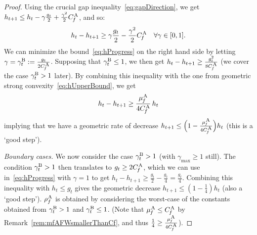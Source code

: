 \documentclass{article} %
\newcommand{\stepsize}{\gamma}
\newcommand{\stepbound}{\stepsize^\textnormal{\scriptsize B}} %
\newcommand{\away}{{\hspace{0.06em}\textnormal{\scriptsize A}}}
\newcommand{\CfAFW}{C_{\hspace{-0.08em}f}^\away}
\newcommand{\strongConvAFW}{\mu_{\hspace{-0.08em}f}^\away}
\newcommand{\0}{\mathbf{0}} %
\begin{document}
\begin{proof}
Using the crucial gap inequality~\eqref{eq:gapDirection}, we get $h_{t+1} \le
h_t - \stepsize \frac{g_t}{2} + \frac{\stepsize^2}{2} \CfAFW$, and so:
\begin{equation} \label{eq:hProgress}
h_t - h_{t+1} \ge \stepsize \frac{g_t}{2} - \frac{\stepsize^2}{2} \CfAFW
\quad \forall \stepsize \in [0,1].  
\end{equation}
We can minimize the bound~\eqref{eq:hProgress} on the right hand side by
letting $\stepsize = \stepbound_t := \frac{g_t}{2\CfAFW}$. Supposing that
$\stepbound_t \leq 1$, we then get $h_t - h_{t+1} \geq 
\frac{g_t^2}{8\CfAFW}$ (we cover the case $\stepbound_t > 1$ later).  By
combining this inequality with the one from geometric strong
convexity~\eqref{eq:hUpperBound}, we get 
\begin{equation} \label{eq:mainGeometric}
h_t - h_{t+1} \ge \frac{\strongConvAFW}{4\CfAFW} \, h_t
\end{equation}
implying that we have a geometric rate of decrease $h_{t+1} \leq
\Big(1-\frac{\strongConvAFW}{4\CfAFW}\Big) h_t$ (this is a `good step').

\emph{Boundary cases.} We now consider the case $\stepbound_t > 1$ (with
$\stepsize_\textrm{max} \geq 1$ still). The condition $\stepbound_t > 1$ then
translates to $g_t \geq 2 \CfAFW$, which we can use in~\eqref{eq:hProgress}
with $\stepsize = 1$ to get $h_t - h_{t+1} \geq \frac{g_t}{2} - \frac{g_t}{4}
= \frac{g_t}{4}$. Combining this inequality with $h_t \leq g_t$ gives the
geometric decrease $h_{t+1} \leq \left(1-\frac{1}{4}\right) h_t$ (also a
`good step'). $\rho_f^\away$ is obtained by considering the worst-case of the
constants obtained from $\stepbound_t > 1$ and $\stepbound_t \leq 1$. (Note
that $\strongConvAFW \leq \CfAFW$ by Remark~\ref{rem:mfAFWsmallerThanCf},
and thus $\frac{1}{4} \geq \frac{\strongConvAFW}{4\CfAFW}$).


\end{proof}
\end{document}
